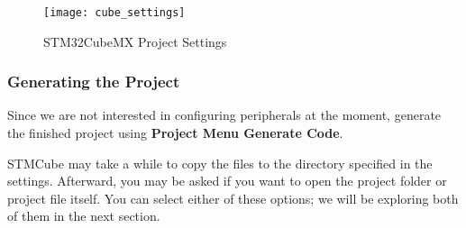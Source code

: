 \documentclass[11pt,fleqn]{book} %
\begin{document}
\begin{figure}[h!]
	\centering\texttt{[image: cube\_settings]}
	\caption{STM32CubeMX Project Settings}
	\label{cube_settings}
\end{figure}

\subsubsection*{Generating the Project}
Since we are not interested in configuring peripherals at the moment, generate the finished project using \textbf{Project Menu \textrightarrow Generate Code}. 

STMCube may take a while to copy the files to the directory specified in the settings. Afterward, you may be asked if you want to open the project folder or project file itself. You can select either of these options; we will be exploring both of them in the next section. %

%
\end{document}
